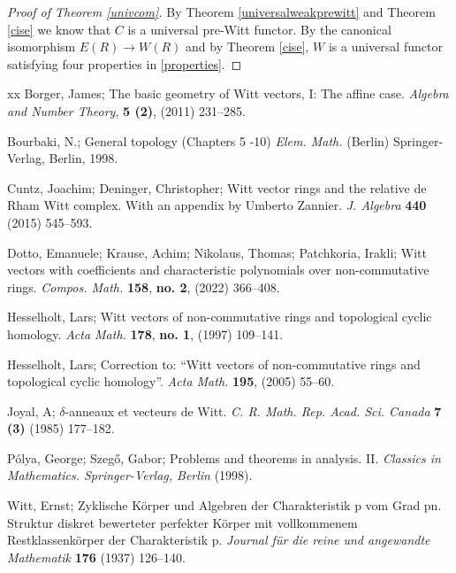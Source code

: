\documentclass[10pt]{amsart}
\theoremstyle{plain}
\theoremstyle{definition}
\begin{document}
\begin{proof}[Proof of Theorem \ref{univcom}] By Theorem \ref{universalweakprewitt} and Theorem \ref{cise} we know that $C$ is a universal pre-Witt functor. By the canonical isomorphism $E(R) \to W(R)$ \cite[Page 561]{cd} and by Theorem \ref{cise}, $W$ is a universal functor satisfying four properties in \ref{properties}. 
\end{proof}
\vspace{1mm}
\begin{thebibliography}{xx}
 Borger, James; The basic geometry of Witt vectors, I: The affine case. {\it Algebra and Number Theory}, {\bf 5 (2)}, (2011) 231--285. 

 Bourbaki, N.;  General topology (Chapters 5 -10) {\it Elem. Math.} (Berlin)
Springer-Verlag, Berlin, 1998.

 Cuntz, Joachim; Deninger, Christopher; Witt vector rings and the relative de Rham Witt complex. With an appendix by Umberto Zannier. {\it J. Algebra} {\bf 440} (2015)  545--593. 

 Dotto, Emanuele; Krause, Achim; Nikolaus, Thomas; Patchkoria, Irakli; Witt vectors with coefficients and characteristic polynomials over non-commutative rings. {\it Compos. Math.} {\bf 158}, {\bf no. 2}, (2022) 366--408.

 Hesselholt, Lars; Witt vectors of non-commutative rings and topological cyclic homology. {\it Acta Math. } {\bf 178}, {\bf no. 1}, (1997) 109--141. 

 Hesselholt, Lars; Correction to: ``Witt vectors of non-commutative rings and topological cyclic homology''. {\it Acta Math.} {\bf 195}, (2005)  55--60.

 Joyal, A; $\delta$-anneaux et vecteurs de Witt. {\it C. R. Math. Rep. Acad. Sci. Canada} {\bf 7 (3)} (1985) 177--182.

 P\'{o}lya, George; Szeg\H{o}, Gabor; Problems and theorems in analysis. II. {\it Classics in Mathematics. Springer-Verlag, Berlin} (1998).

 Witt, Ernst; Zyklische Körper und Algebren der Charakteristik p vom Grad pn. Struktur diskret bewerteter perfekter Körper mit vollkommenem Restklassenkörper der Charakteristik p. {\it Journal für die reine und angewandte Mathematik} {\bf 176} (1937) 126--140.


\end{thebibliography}
\end{document}
